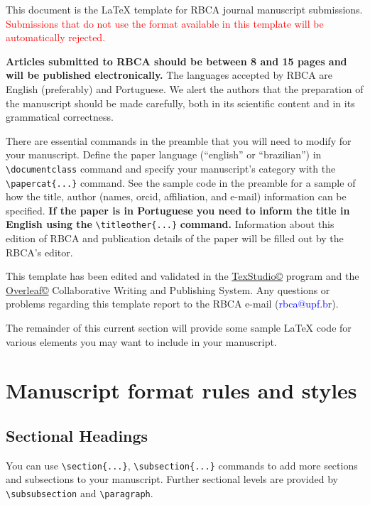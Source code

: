 \documentclass[alpha-refs,brazilian]{RBCA_v3.0}
\begin{document}
This document is the \LaTeX{} template for RBCA journal manuscript submissions. \textcolor{red}{Submissions that do not use the format available in this template will be automatically rejected.} 

\textbf{Articles submitted to RBCA should be between 8 and 15 pages and will be published electronically.} The languages accepted by RBCA are English (preferably) and Portuguese. We alert the authors that the preparation of the manuscript should be made carefully, both in its scientific content and in its grammatical correctness.

There are essential commands in the preamble that you will need to modify for your manuscript. Define the paper language (``english'' or ``brazilian'') in \verb|\documentclass| command and specify your manuscript's category with the \verb|\papercat{...}| command. See the sample code in the preamble for a sample of how the title, author (names, orcid, affiliation, and e-mail) information can be specified. \textbf{If the paper is in Portuguese you need to inform the title in English using the} \verb|\titleother{...}| \textbf{command.} Information about this edition of RBCA and publication details of the paper will be filled out by the RBCA's editor.

This template has been edited and validated in the \href{http://www.texstudio.org/}{TexStudio\copyright} program and the \href{https://www.overleaf.com/}{Overleaf\copyright} Collaborative Writing and Publishing System. Any questions or problems regarding this template report to the RBCA e-mail (\textcolor{blue}{rbca@upf.br}).

The remainder of this current section will provide some sample \LaTeX{} code for various elements you may want to include in your manuscript.

\section{Manuscript format rules and styles}

\subsection{Sectional Headings}
You can use \verb|\section{...}|, \verb|\subsection{...}| commands to add more sections and subsections to your manuscript. Further sectional levels are provided by \verb|\subsubsection| and \verb|\paragraph|.
\end{document}
